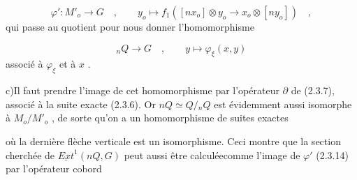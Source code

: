 \begin{equation}\tag{2.3.14}
\varphi' : M'_o \longrightarrow G \quad , \qquad y_o \longmapsto f_1([nx_o] \otimes y_o \to x_o \otimes [ny_o]) \quad ,
\end{equation}
qui passe au quotient pour nous donner l'homomorphisme

\begin{equation*}
{}_nQ \longrightarrow G \quad , \qquad y \longmapsto \varphi_{\xi}(x,y)
\end{equation*}
associé à $\varphi_{\xi}$ et à $x$ .

c)\quad Il faut prendre l'image de cet homomorphisme par l'opérateur $\partial$ de (2.3.7), associé à la suite exacte (2.3.6). Or $nQ \simeq Q/{}_nQ$ est évidemment aussi isomorphe à $M_o/M'_o$ , de sorte qu'on a un homomorphisme de suites exactes 


\begin{center}
\end{center}
 où la dernière flèche verticale est un isomorphisme. Ceci montre que la section cherchée de $\underline{Ext}^1(nQ,G)$ peut aussi être calculéecomme l'image de $\varphi'$ (2.3.14) par l'opérateur cobord

